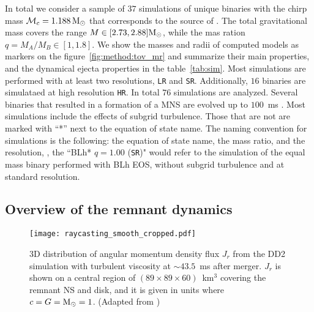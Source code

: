 In total we consider a sample of $37$ simulations of unique binaries with the 
chirp mass $\mathcal{M}_c = 1.188\,{\text{M}_{\odot}}$ that corresponds to the source of \GW{}.
The total gravitational mass covers the range $M\in[2.73, 2.88]{\text{M}_{\odot}}$, while the 
mas ration $q=M_A/M_B\in[1,1.8]$. 
We show the masses and radii of computed models as markers on the 
figure~\ref{fig:method:tov_mr} and summarize their main properties, 
and the dynamical ejecta properties in the table~\ref{tab:sim}.
Most simulations are performed with at least two resolutions, 
\texttt{LR} and \texttt{SR}. 
Additionally, $16$ binaries are simulataed at high resolution \texttt{HR}.
In total $76$ simulations are analyzed.
Several binaries that resulted in a formation of a MNS are evolved up to 
$100$~ms \pmerg.
Most simulations include the effects of subgrid turbulence. 
Those that are not are marked with ``*'' next to the equation of state name.
The naming convention for simulations is the following: 
the equation of state name, the mass ratio, and the resolution, \eg, 
the ``BLh* $q=1.00$ (\texttt{SR})" would refer to the simulation of the equal mass
binary performed with BLh EOS, without subgrid turbulence and at standard resolution. 




\subsection{Overview of the remnant dynamics}
\label{sec:bns_dynsmics_overview}




\begin{figure}[t]
    \centering
    \texttt{[image: raycasting\_smooth\_cropped.pdf]}
    \caption{3D distribution of angular momentum density flux $J_r$
        from the DD2 simulation with turbulent viscosity at ${\sim}43.5$~ms after
        merger. $J_r$ is shown on a central region of
        $(89\times89\times60)$~km${}^3$ covering the remnant NS
        and disk, and it is given in units where $c=G={\text{M}_{\odot}}=1$.
        (Adapted from \citet{Nedora:2019jhl})
    }
    \label{fig:ang_mom_flux}
\end{figure}

